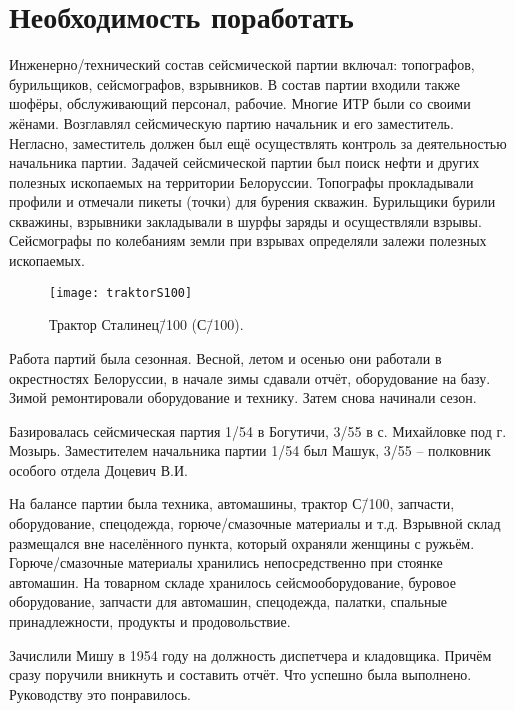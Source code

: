 ﻿\chapter{Необходимость поработать}

Инженерно\-/технический состав сейсмической партии включал: топографов, бурильщиков, сейсмографов, взрывников. В состав партии входили также шофёры, обслуживающий персонал, рабочие. Многие ИТР были со своими жёнами. Возглавлял сейсмическую партию начальник и его заместитель. Негласно, заместитель должен был ещё осуществлять контроль за деятельностью начальника партии. Задачей сейсмической партии был поиск нефти и других полезных ископаемых на территории Белоруссии. Топографы прокладывали профили и отмечали пикеты (точки) для бурения скважин. Бурильщики бурили скважины, взрывники закладывали в шурфы заряды и осуществляли взрывы. Сейсмографы по колебаниям земли при взрывах определяли залежи полезных ископаемых.

\begin{wrapfigure}{O}{.4\textwidth}
\centering
\texttt{[image: traktorS100]}
\caption[Трактор Сталинец\=/100 (С\=/100).]{Трактор Сталинец\=/100 (С\=/100)\footnotemark.}
\label{fig:traktorS100}
\end{wrapfigure}

Работа партий была сезонная. Весной, летом и осенью они работали в окрестностях Белоруссии, в начале зимы сдавали отчёт, оборудование на базу. Зимой ремонтировали оборудование и технику. Затем снова начинали сезон.

Базировалась сейсмическая партия 1/54 в Богутичи, 3/55 в с. Михайловке под г. Мозырь. Заместителем начальника партии 1/54 был Машук, 3/55 \--- полковник особого отдела Доцевич В.И.

На балансе партии была техника, автомашины, трактор С\=/100, запчасти, оборудование, спецодежда, горюче\-/смазочные материалы и т.д. Взрывной склад размещался вне населённого пункта, который охраняли женщины с ружьём. Горюче\-/смазочные материалы хранились непосредственно при стоянке автомашин. На товарном складе хранилось сейсмооборудование, буровое оборудование, запчасти для автомашин, спецодежда, палатки, спальные принадлежности, продукты и продовольствие.

Зачислили Мишу в 1954 году на должность диспетчера и кладовщика. Причём сразу поручили вникнуть и составить отчёт. Что успешно была выполнено. Руководству это понравилось.

